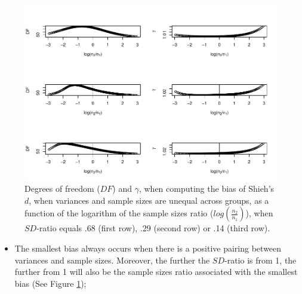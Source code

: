 \documentclass[
  english,
  man,mask]{apa6}
\providecommand{\tightlist}{%
  \setlength{\itemsep}{0pt}\setlength{\parskip}{0pt}}
\begin{document}
\begin{figure}
\centering
\includegraphics{Theoretical-Bias-of-all-estimators-as-a-function-of-population-parameters_files/figure-latex/biasshiehhetunbaldfandvar-1.pdf}
\caption{\label{fig:biasshiehhetunbaldfandvar}Degrees of freedom (\(DF\)) and \(\gamma\), when computing the bias of Shieh's \(d\), when variances and sample sizes are unequal across groups, as a function of the logarithm of the sample sizes ratio (\(log \left( \frac{n_2}{n_1} \right)\)), when \(SD\)-ratio equals .68 (first row), .29 (second row) or .14 (third row).}
\end{figure}

\begin{itemize}
\tightlist
\item
  The smallest bias always occurs when there is a positive pairing between variances and sample sizes. Moreover, the further the \(SD\)-ratio is from 1, the further from 1 will also be the sample sizes ratio associated with the smallest bias (See Figure \ref{fig:biasshiehhetunbaldfandvar});
\end{itemize}
\end{document}

